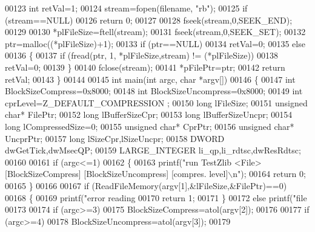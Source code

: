 \begin{DoxyCode}
{{00123     \textcolor{keywordtype}{int} retVal=1;
00124     stream=fopen(filename, \textcolor{stringliteral}{"rb"});
00125     \textcolor{keywordflow}{if} (stream==NULL)
00126         \textcolor{keywordflow}{return} 0;
00127 
00128     fseek(stream,0,SEEK\_END);
00129 
00130     *plFileSize=ftell(stream);
00131     fseek(stream,0,SEEK\_SET);
00132     ptr=malloc((*plFileSize)+1);
00133     \textcolor{keywordflow}{if} (ptr==NULL)
00134         retVal=0;
00135     \textcolor{keywordflow}{else}
00136     \{
00137         \textcolor{keywordflow}{if} (fread(ptr, 1, *plFileSize,stream) != (*plFileSize))
00138             retVal=0;
00139     \}
00140     fclose(stream);
00141     *pFilePtr=ptr;
00142     \textcolor{keywordflow}{return} retVal;
00143 \}
00144 
00145 \textcolor{keywordtype}{int} main(\textcolor{keywordtype}{int} argc, \textcolor{keywordtype}{char} *argv[])
00146 \{
00147     \textcolor{keywordtype}{int} BlockSizeCompress=0x8000;
00148     \textcolor{keywordtype}{int} BlockSizeUncompress=0x8000;
00149     \textcolor{keywordtype}{int} cprLevel=Z\_DEFAULT\_COMPRESSION ;
00150     \textcolor{keywordtype}{long} lFileSize;
00151     \textcolor{keywordtype}{unsigned} \textcolor{keywordtype}{char}* FilePtr;
00152     \textcolor{keywordtype}{long} lBufferSizeCpr;
00153     \textcolor{keywordtype}{long} lBufferSizeUncpr;
00154     \textcolor{keywordtype}{long} lCompressedSize=0;
00155     \textcolor{keywordtype}{unsigned} \textcolor{keywordtype}{char}* CprPtr;
00156     \textcolor{keywordtype}{unsigned} \textcolor{keywordtype}{char}* UncprPtr;
00157     \textcolor{keywordtype}{long} lSizeCpr,lSizeUncpr;
00158     DWORD dwGetTick,dwMsecQP;
00159     LARGE\_INTEGER li\_qp,li\_rdtsc,dwResRdtsc;
00160 
00161     \textcolor{keywordflow}{if} (argc<=1)
00162     \{
00163         printf(\textcolor{stringliteral}{"run TestZlib <File> [BlockSizeCompress] [BlockSizeUncompress] [compres. level]\(\backslash\)n"});
00164         \textcolor{keywordflow}{return} 0;
00165     \}
00166 
00167     \textcolor{keywordflow}{if} (ReadFileMemory(argv[1],&lFileSize,&FilePtr)==0)
00168     \{
00169         printf(\textcolor{stringliteral}{"error reading %
00170         \textcolor{keywordflow}{return} 1;
00171     \}
00172     \textcolor{keywordflow}{else} printf(\textcolor{stringliteral}{"file %
00173 
00174     \textcolor{keywordflow}{if} (argc>=3)
00175         BlockSizeCompress=atol(argv[2]);
00176 
00177     \textcolor{keywordflow}{if} (argc>=4)
00178         BlockSizeUncompress=atol(argv[3]);
00179 
}}}}
\end{DoxyCode}
